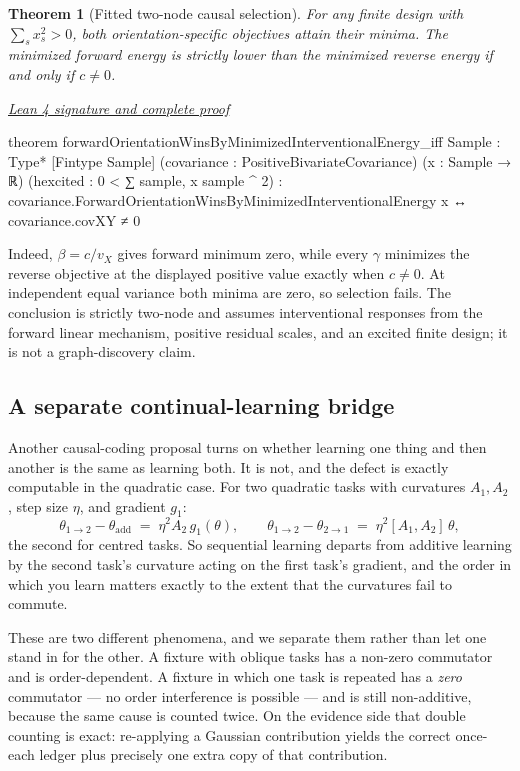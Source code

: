 \documentclass[11pt]{article}
\newtheorem{theorem}{Theorem}[section]
\newcommand{\leancommit}{f3a31db36bb2f944312ee31c1d86c2758109e83a}
\newcommand{\leansignaturelink}[2]{%
  \par\Needspace{0.3\textheight}\smallskip\noindent
  \href{https://github.com/zariuq/MeTTapedia/blob/\leancommit/#1\#L#2}{%
    \scriptsize\itshape Lean 4 signature and complete proof}\par\nobreak}
\begin{document}
\begin{theorem}[Fitted two-node causal selection]\label{thm:causalselection}
For any finite design with $\sum_s x_s^2>0$, both orientation-specific objectives attain
their minima.  The minimized forward energy is strictly lower than the minimized reverse
energy if and only if $c\ne0$.
\end{theorem}

\leansignaturelink{lean/mettapedia/Mettapedia/MachineLearning/NeuralNetworks/%
PredictiveCoding/CausalDirectionSelection.lean}{316}
\begin{leansignature}
theorem forwardOrientationWinsByMinimizedInterventionalEnergy_iff
    {Sample : Type*} [Fintype Sample]
    (covariance : PositiveBivariateCovariance) (x : Sample → ℝ)
    (hexcited : 0 < ∑ sample, x sample ^ 2) :
    covariance.ForwardOrientationWinsByMinimizedInterventionalEnergy x ↔
      covariance.covXY ≠ 0
\end{leansignature}

Indeed, $\beta=c/v_X$ gives forward minimum zero, while every $\gamma$ minimizes the
reverse objective at the displayed positive value exactly when $c\ne0$.  At independent
equal variance both minima are zero, so selection fails.  The conclusion is strictly
two-node and assumes interventional responses from the forward linear mechanism,
positive residual scales, and an excited finite design; it is not a graph-discovery
claim.

\subsection{A separate continual-learning bridge}

Another causal-coding proposal turns on whether learning one thing and then another
is the same as learning both. It is not, and the defect is exactly computable in the
quadratic case. For two quadratic tasks with curvatures $A_1, A_2$, step size $\eta$, and
gradient $g_1$:
\[
\theta_{1\to2} - \theta_{\mathrm{add}} \;=\; \eta^2 A_2\, g_1(\theta),
\qquad
\theta_{1\to2} - \theta_{2\to1} \;=\; \eta^2 [A_1, A_2]\, \theta ,
\]
the second for centred tasks. So sequential learning departs from additive learning by the
second task's curvature acting on the first task's gradient, and the order in which you
learn matters exactly to the extent that the curvatures fail to commute.

These are two different phenomena, and we separate them rather than let one stand in for
the other. A fixture with oblique tasks has a non-zero commutator and is order-dependent.
A fixture in which one task is repeated has a \emph{zero} commutator --- no order
interference is possible --- and is still non-additive, because the same cause is counted
twice. On the evidence side that double counting is exact: re-applying a Gaussian
contribution yields the correct once-each ledger plus precisely one extra copy of that
contribution.
\end{document}
